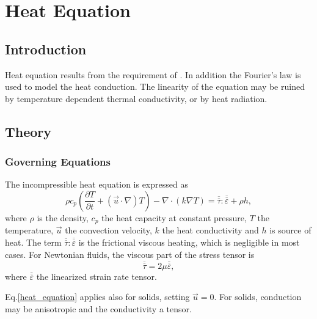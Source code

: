 \chapter{Heat Equation}


\section{Introduction}

Heat equation results from the requirement of .
In addition the Fourier's law is used to model
the heat conduction. The linearity of the equation may be 
ruined by temperature dependent thermal conductivity, or by
heat radiation.

\section{Theory}

\subsection{Governing Equations}
The incompressible heat equation is expressed as
\begin{equation}
\rho  c_p\left( \frac{\partial T}{\partial t}+(\vec u\cdot\nabla) T\right) - 
\nabla\cdot(k\nabla T) =
\overline{\overline\tau}:\overline{\overline \varepsilon} + \rho h,
\label{heat_equation}
\end{equation}
where $\rho$ is the density, $c_p$ the heat capacity at constant pressure, 
$T$ the temperature, $\vec u$ the convection velocity, $k$ the heat 
conductivity and $h$ is source of heat.
The term $\overline{\overline\tau}:\overline{\overline \varepsilon}$ is the
frictional viscous heating, which is negligible in most cases. For Newtonian
fluids, the viscous
part of the stress tensor is
\begin{equation}
\overline{\overline\tau} = 2\mu \overline{\overline\varepsilon},
\end{equation}
where $\overline{\overline \varepsilon}$ the linearized strain rate tensor.

Eq.\ref{heat_equation} applies also for solids, setting $\vec u = 0$. For
solids, conduction may be anisotropic and the conductivity a tensor.

